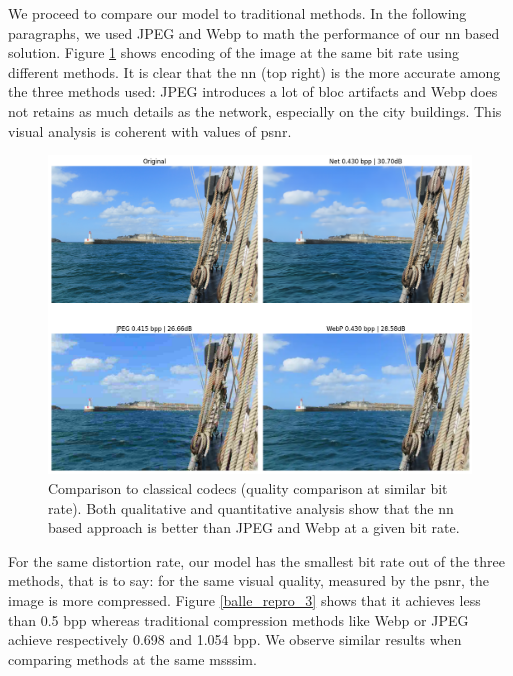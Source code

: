 We proceed to compare our model to traditional methods. In the following paragraphs, we used JPEG and Webp to math the performance of our \acrshort{nn} based solution. Figure \ref{balle_repro_2} shows encoding of the image at the same bit rate using different methods. It is clear that the \acrshort{nn} (top right) is the more accurate among the three methods used: JPEG introduces a lot of bloc artifacts and Webp does not retains as much details as the network, especially on the city buildings. This visual analysis is coherent with values of \acrshort{psnr}.

\begin{figure}
    \centering
    \includegraphics[width=15cm]{img/balle_repro_bpp.png}
    \caption[Comparison to classical codecs (quality comparison at similar bit rate).]{Comparison to classical codecs (quality comparison at similar bit rate). Both qualitative and quantitative analysis show that the \acrshort{nn} based approach is better than JPEG and Webp at a given bit rate.}
    \label{balle_repro_2}
\end{figure}

For the same distortion rate, our model has the smallest bit rate out of the three methods, that is to say: for the same visual quality, measured by the \acrshort{psnr}, the image is more compressed. Figure \ref{balle_repro_3} shows that it achieves less than 0.5 \acrshort{bpp} whereas traditional compression methods like Webp or JPEG achieve respectively 0.698 and 1.054 \acrshort{bpp}. We observe similar results when comparing methods at the same \acrshort{msssim}.

